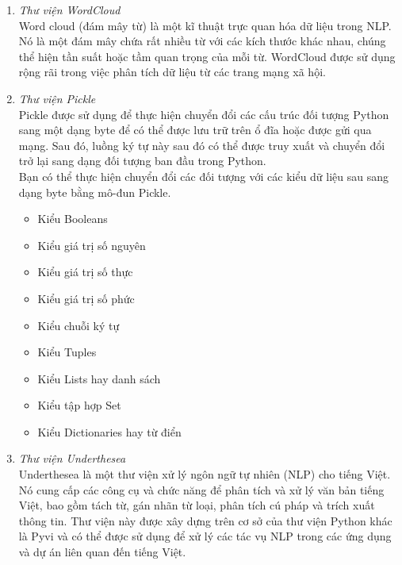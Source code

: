 \begin{enumerate}
    \item \textit{Thư viện WordCloud}\\
    Word cloud (đám mây từ) là một kĩ thuật trực quan hóa dữ liệu trong NLP. Nó là một đám mây chứa rất nhiều từ với các kích thước khác nhau, chúng thể hiện tần suất hoặc tầm quan trọng của mỗi từ. WordCloud được sử dụng rộng rãi trong việc phân tích dữ liệu từ các trang mạng xã hội. \cite{webpage17}

    \item \textit{Thư viện Pickle}\\
    Pickle được sử dụng để thực hiện chuyển đổi các cấu trúc đối tượng Python sang một dạng byte để có thể được lưu trữ trên ổ đĩa hoặc được gửi qua mạng. Sau đó, luồng ký tự này sau đó có thể được truy xuất và chuyển đổi trở lại sang dạng đối tượng ban đầu trong Python. \cite{webpage18}\\
    Bạn có thể thực hiện chuyển đổi các đối tượng với các kiểu dữ liệu sau sang dạng byte bằng mô-đun Pickle.
    \begin{itemize}
        \item Kiểu Booleans
        \item Kiểu giá trị số nguyên
        \item Kiểu giá trị số thực
        \item Kiểu giá trị số phức
        \item Kiểu chuỗi ký tự
        \item Kiểu Tuples
        \item Kiểu Lists hay danh sách
        \item Kiểu tập hợp Set
        \item Kiểu Dictionaries hay từ điển
    \end{itemize}

    \item \textit{Thư viện Underthesea}\\
    Underthesea là một thư viện xử lý ngôn ngữ tự nhiên (NLP) cho tiếng Việt. Nó cung cấp các công cụ và chức năng để phân tích và xử lý văn bản tiếng Việt, bao gồm tách từ, gán nhãn từ loại, phân tích cú pháp và trích xuất thông tin. Thư viện này được xây dựng trên cơ sở của thư viện Python khác là Pyvi và có thể được sử dụng để xử lý các tác vụ NLP trong các ứng dụng và dự án liên quan đến tiếng Việt.


\end{enumerate}

